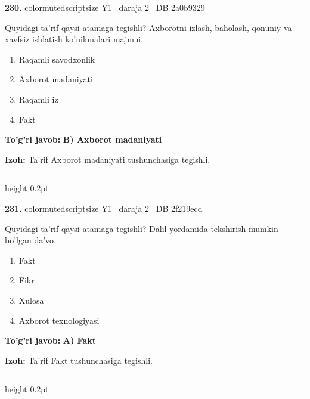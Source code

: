 \documentclass[10pt,a4paper,oneside]{article}
\begin{document}
\noindent\textbf{\color{ink}230.}  {color{muted}scriptsize Y1 \textbullet\ daraja 2 \textbullet\ DB 2a0b9329}
\par
Quyidagi ta'rif qaysi atamaga tegishli? Axborotni izlash, baholash, qonuniy va xavfsiz ishlatish ko'nikmalari majmui.
\begin{enumerate}[label=\Alph*),leftmargin=9mm]
\item Raqamli savodxonlik
\item Axborot madaniyati
\item Raqamli iz
\item Fakt
\end{enumerate}
\begin{tcolorbox}[enhanced,breakable,colback=teal!4,colframe=teal!50!black,boxrule=0.5pt,arc=1.1mm,left=3mm,right=3mm,top=1.7mm,bottom=1.7mm,before skip=2mm,after skip=2mm]
\textbf{\color{teal}To'g'ri javob:} \textbf{B) Axborot madaniyati}
\par\smallskip
\textbf{Izoh:} Ta'rif Axborot madaniyati tushunchasiga tegishli.
\end{tcolorbox}
\vspace{2mm}\hrule height 0.2pt \vspace{3mm}

\noindent\textbf{\color{ink}231.}  {color{muted}scriptsize Y1 \textbullet\ daraja 2 \textbullet\ DB 2f219ecd}
\par
Quyidagi ta'rif qaysi atamaga tegishli? Dalil yordamida tekshirish mumkin bo'lgan da'vo.
\begin{enumerate}[label=\Alph*),leftmargin=9mm]
\item Fakt
\item Fikr
\item Xulosa
\item Axborot texnologiyasi
\end{enumerate}
\begin{tcolorbox}[enhanced,breakable,colback=teal!4,colframe=teal!50!black,boxrule=0.5pt,arc=1.1mm,left=3mm,right=3mm,top=1.7mm,bottom=1.7mm,before skip=2mm,after skip=2mm]
\textbf{\color{teal}To'g'ri javob:} \textbf{A) Fakt}
\par\smallskip
\textbf{Izoh:} Ta'rif Fakt tushunchasiga tegishli.
\end{tcolorbox}
\vspace{2mm}\hrule height 0.2pt \vspace{3mm}
\end{document}

